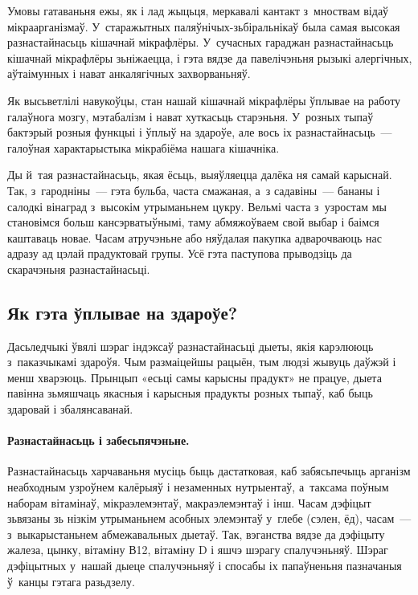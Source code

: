 Умовы гатаваньня ежы, як і лад жыцьця, меркавалі кантакт з~мноствам відаў мікраарганізмаў. У~старажытных паляўнічых-зьбіральнікаў была самая высокая разнастайнасьць кішачнай мікрафлёры. У~сучасных гараджан разнастайнасьць кішачнай мікрафлёры зьніжаецца, і гэта вядзе да павелічэньня рызыкі алергічных, аўтаімунных і нават анкалягічных захворваньняў.


Як высьветлілі навукоўцы, стан нашай кішачнай мікрафлёры ўплывае на работу галаўнога мозгу, мэтабалізм і нават хуткасьць старэньня. У~розных тыпаў бактэрый розныя функцыі і ўплыў на здароўе, але вось іх разнастайнасьць~--- галоўная характарыстыка мікрабіёма нашага кішачніка.

Ды й~тая разнастайнасьць, якая ёсьць, выяўляецца далёка ня самай карыснай. Так, з~гародніны~--- гэта бульба, часта смажаная, а~з садавіны~--- бананы і салодкі вінаград з~высокім утрыманьнем цукру. Вельмі часта з~узростам мы становімся больш кансэрватыўнымі, таму абмяжоўваем свой выбар і баімся каштаваць новае. Часам атручэньне або няўдалая пакупка адварочваюць нас адразу ад цэлай прадуктовай групы. Усё гэта паступова прыводзіць да скарачэньня разнастайнасьці.

\subsection{Як гэта ўплывае на здароўе?}

Дасьледчыкі ўвялі шэраг індэксаў разнастайнасьці дыеты, якія карэлююць з~паказчыкамі здароўя. Чым размаіцейшы рацыён, тым людзі жывуць даўжэй і менш хварэюць. Прынцып «есьці самы карысны прадукт» не працуе, дыета павінна зьмяшчаць якасныя і карысныя прадукты розных тыпаў, каб быць здаровай і збалянсаванай.

\paragraph{Разнастайнасьць і забесьпячэньне.}
Разнастайнасьць харчаваньня мусіць быць дастатковая, каб забясьпечыць арганізм неабходным узроўнем калёрыяў і незаменных нутрыентаў, а~таксама поўным наборам вітамінаў, мікраэлемэнтаў, макраэлемэнтаў і інш. Часам дэфіцыт зьвязаны зь нізкім утрыманьнем асобных элемэнтаў у~глебе (сэлен, ёд), часам~--- з~выкарыстаньнем абмежавальных дыетаў. Так, вэганства вядзе да дэфіцыту жалеза, цынку, вітаміну В12, вітаміну D і яшчэ шэрагу спалучэньняў. Шэраг дэфіцытных у~нашай дыеце спалучэньняў і спосабы іх папаўненьня пазначаныя ў~канцы гэтага разьдзелу.

